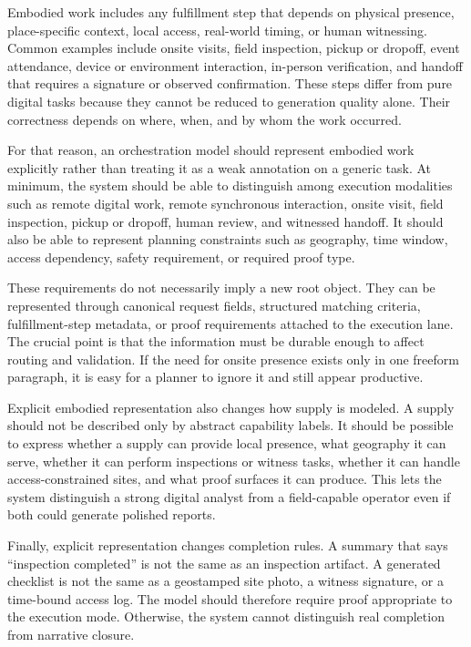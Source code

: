 Embodied work includes any fulfillment step that depends on physical presence, place-specific context, local access, real-world timing, or human witnessing. Common examples include onsite visits, field inspection, pickup or dropoff, event attendance, device or environment interaction, in-person verification, and handoff that requires a signature or observed confirmation. These steps differ from pure digital tasks because they cannot be reduced to generation quality alone. Their correctness depends on where, when, and by whom the work occurred.

For that reason, an orchestration model should represent embodied work explicitly rather than treating it as a weak annotation on a generic task. At minimum, the system should be able to distinguish among execution modalities such as remote digital work, remote synchronous interaction, onsite visit, field inspection, pickup or dropoff, human review, and witnessed handoff. It should also be able to represent planning constraints such as geography, time window, access dependency, safety requirement, or required proof type.

These requirements do not necessarily imply a new root object. They can be represented through canonical request fields, structured matching criteria, fulfillment-step metadata, or proof requirements attached to the execution lane. The crucial point is that the information must be durable enough to affect routing and validation. If the need for onsite presence exists only in one freeform paragraph, it is easy for a planner to ignore it and still appear productive.

Explicit embodied representation also changes how supply is modeled. A supply should not be described only by abstract capability labels. It should be possible to express whether a supply can provide local presence, what geography it can serve, whether it can perform inspections or witness tasks, whether it can handle access-constrained sites, and what proof surfaces it can produce. This lets the system distinguish a strong digital analyst from a field-capable operator even if both could generate polished reports.

Finally, explicit representation changes completion rules. A summary that says ``inspection completed'' is not the same as an inspection artifact. A generated checklist is not the same as a geostamped site photo, a witness signature, or a time-bound access log. The model should therefore require proof appropriate to the execution mode. Otherwise, the system cannot distinguish real completion from narrative closure.
